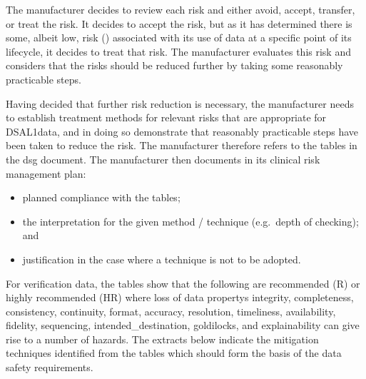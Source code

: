 The manufacturer decides to review each risk and either avoid, accept, transfer, or \gls{treat} the risk. It decides to accept the  risk, but as it has determined there is some, albeit low, risk () associated with its use of data at a specific point of its lifecycle, it decides to \gls{treat} that risk. The manufacturer evaluates this risk and considers that the risks should be reduced further by taking some reasonably practicable steps.

Having decided that further risk reduction is necessary, the manufacturer needs to establish \gls{treatment} methods for relevant risks that are appropriate for DSAL1data, and in doing so demonstrate that reasonably practicable steps have been taken to reduce the risk. The manufacturer therefore refers to the tables in the \gls{dsg} document. The manufacturer then documents in its clinical risk management plan:

\begin{itemize}
  \item planned compliance with the tables;
  \item the interpretation for the given method / technique (e.g.\ depth of checking); and
  \item justification in the case where a technique is not to be adopted.
\end{itemize}

For  \gls{verification} data, the tables show that the following are recommended (R) or highly recommended (HR) where loss of \glspl{data property} 
	\gls{integrity},
	\gls{completeness}, 
	\gls{consistency},
	\gls{continuity},
	format,
	\gls{accuracy},
	\gls{resolution},
	\gls{timeliness},
	\gls{availability},
	\gls{fidelity},
	\gls{sequencing},
	\gls{intended_destination},
	\gls{goldilocks}, and
	\gls{explainability}
can give rise to
a number of \glspl{hazard}. The extracts below indicate the \gls{mitigation} techniques identified from the tables which should form the basis of the \glspl{data safety requirement}. 

